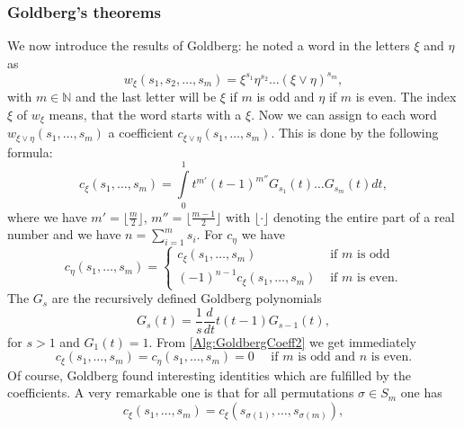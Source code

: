 \subsubsection{Goldberg's theorems}
We now introduce the results of Goldberg: he noted a word in the letters $\xi$ 
and $\eta$ as
\begin{equation*}
	w_{\xi}(s_1, s_2, \ldots, s_m)
	=
	\xi^{s_1} \eta^{s_2} \ldots (\xi \vee \eta)^{s_m},
\end{equation*}
with $m \in \mathbb{N}$ and the last letter will be $\xi$ if $m$ is odd and 
$\eta$ if $m$ is even. The index $\xi$ of $w_{\xi}$ means, that the word 
starts with a $\xi$. Now we can assign to each word $w_{\xi \vee \eta}(s_1, 
\ldots, s_m)$ a coefficient $c_{\xi \vee \eta}(s_1, \ldots, s_m)$. This is 
done by the following formula:
\begin{equation}
	\label{Alg:GoldbergCoeff1}
	c_{\xi}(s_1, \ldots, s_m) 
	= 
	\int\limits_0^1 
	t^{m'} (t - 1)^{m''} 
	G_{s_1}(t) \ldots G_{s_m}(t) dt,
\end{equation}
where we have $m' = \lfloor \frac{m}{2} \rfloor$, $m'' = \lfloor \frac{m-1}{2} 
\rfloor$ with $\lfloor \cdot \rfloor$ denoting the entire part of a real 
number and we have $n = \sum_{i = 1}^m s_i$. For $c_{\eta}$ we have
\begin{equation}
	\label{Alg:GoldbergCoeff2}
	c_{\eta}\left( s_1, \ldots, s_m \right)
	= 
	\begin{cases}
		c_{\xi}\left( s_1, \ldots, s_m \right)
		& 
		\text{ if } m \text{ is odd} 
		\\
		(-1)^{n-1} c_{\xi} \left( s_1, \ldots, s_m \right)
		& 
		\text{ if } m \text{ is even.}
	\end{cases}
\end{equation}
The $G_s$ are the recursively defined Goldberg polynomials
\begin{equation}
	\label{Alg:GoldbergPolynomials}
	G_s(t) 
	= 
	\frac{1}{s} 
	\frac{d}{dt} 
	t(t-1) G_{s-1}(t),
\end{equation}
for $s > 1$ and $G_1(t) = 1$. From \eqref{Alg:GoldbergCoeff2} we get 
immediately
\begin{equation*}
	c_{\xi}\left( s_1, \ldots, s_m \right)
	= 
	c_{\eta}\left( s_1, \ldots, s_m \right) 
	= 
	0 
	\quad 
	\text{ if $m$ is odd and $n$ is even.}
\end{equation*}
Of course, Goldberg found interesting identities which are fulfilled by the 
coefficients. A very remarkable one is that for all permutations $\sigma \in 
S_m$ one has
\begin{equation*}
	c_{\xi}\left( s_1, \ldots, s_m \right)
	=
	c_{\xi}\left( s_{\sigma(1)}, \ldots, s_{\sigma(m)} \right),
\end{equation*}
